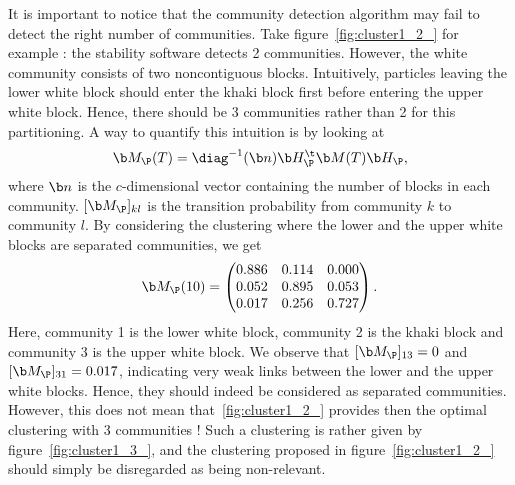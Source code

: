 It is important to notice that the community detection algorithm may fail to detect the right number of communities. Take figure~\ref{fig:cluster1_2_} for example : the stability software detects 2 communities. However, the white community consists of two noncontiguous blocks. Intuitively, particles leaving the lower white block should enter the khaki block first before entering the upper white block. Hence, there should be 3 communities rather than 2 for this partitioning. A way to quantify this intuition is by looking at
\begin{equation}
	\b M_{\P}(T) = \diag^{-1}(\b n)\b H^{\t}_{\P} \b M(T) \b H_{\P},
\end{equation}
where $\b n$ is the $c$-dimensional vector containing the number of blocks in each community. $[\b M_{\P}]_{kl}$ is the transition probability from community $k$ to community $l$. By considering the clustering where the lower and the upper white blocks are separated communities, we get
\begin{equation}
	\b M_{\P}(10) = 
	\begin{pmatrix}
		0.886 & 0.114 & 0.000\\
	    0.052 & 0.895 & 0.053\\
	    0.017 & 0.256 & 0.727\\
    \end{pmatrix}.
\end{equation}
Here, community 1 is the lower white block, community 2 is the khaki block and community 3 is the upper white block. We observe that $[\b M_{\P}]_{13} = 0$ and $[\b M_{\P}]_{31} = 0.017$, indicating very weak links between the lower and the upper white blocks. Hence, they should indeed be considered as separated communities. However, this does not mean that~\ref{fig:cluster1_2_} provides then the optimal clustering with 3 communities ! Such a clustering is rather given by figure~\ref{fig:cluster1_3_}, and the clustering proposed in figure~\ref{fig:cluster1_2_} should simply be disregarded as being non-relevant.

